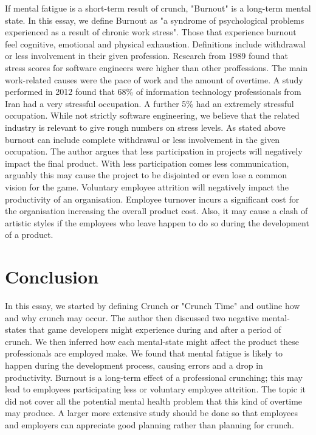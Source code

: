 \documentclass{scrartcl}
\begin{document}
If mental fatigue is a short-term result of crunch, "Burnout" is a long-term mental state. In this essay, we define Burnout as "a syndrome of psychological problems experienced as a result of chronic work stress"\cite{milfont2008burnout}. Those that experience burnout feel cognitive, emotional and physical exhaustion\cite{sonnentag1994stressor}. Definitions include withdrawal or less involvement in their given profession\cite{sonnentag1994stressor}. Research from 1989 found that stress scores for software engineers were higher than other proffessions\cite{kumash1989work}. The main work-related causes were the pace of work and the amount of overtime\cite{kumash1989work}. A study performed in 2012 found that 68\% of information technology professionals from Iran had a very stressful occupation\cite{bolhari2012occupational}. A further 5\% had an extremely stressful occupation\cite{bolhari2012occupational}. While not strictly software engineering, we believe that the related industry is relevant to give rough numbers on stress levels. As stated above burnout can include complete withdrawal or less involvement in the given occupation. The author argues that less participation in projects will negatively impact the final product. With less participation comes less communication, arguably this may cause the project to be disjointed or even lose a common vision for the game. Voluntary employee attrition will negatively impact the productivity of an organisation\cite{dess2001voluntary}. Employee turnover incurs a significant cost for the organisation \cite{morrell2004organisational} increasing the overall product cost. Also, it may cause a clash of artistic styles if the employees who leave happen to do so during the development of a product. 

\section{Conclusion}
In this essay, we started by defining Crunch or "Crunch Time"  and outline how and why crunch may occur. The author then discussed two negative mental-states that game developers might experience during and after a period of crunch. We then inferred how each mental-state might affect the product these professionals are employed make. We found that mental fatigue is likely to happen during the development process, causing errors and a drop in productivity. Burnout is a long-term effect of a professional crunching; this may lead to employees participating less or voluntary employee attrition. The topic it did not cover all the potential mental health problem that this kind of overtime may produce. A larger more extensive study should be done so that employees and employers can appreciate good planning rather than planning for crunch.


\end{document}
